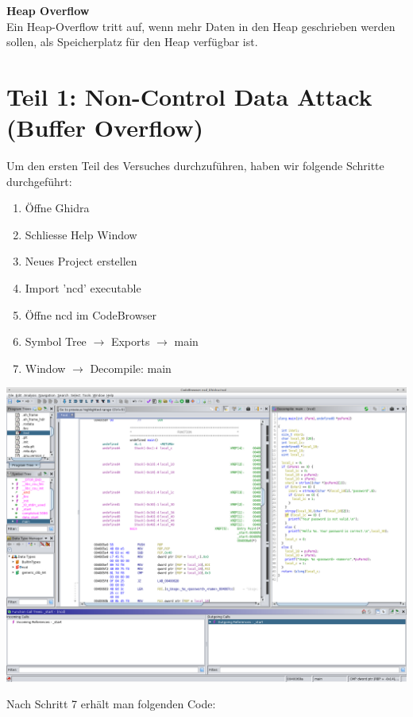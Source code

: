 \documentclass[12pt,a4paper]{article}
\begin{document}
\textbf{Heap Overflow}\\
Ein Heap-Overflow tritt auf, wenn mehr Daten in den Heap geschrieben werden sollen, als Speicherplatz für 
den Heap verfügbar ist.
\bigskip

\section*{Teil 1: Non-Control Data Attack (Buffer Overflow)}

Um den ersten Teil des Versuches durchzuführen, haben wir folgende Schritte durchgeführt:

\begin{enumerate}
\item Öffne Ghidra
\item Schliesse Help Window
\item Neues Project erstellen
\item Import 'ncd' executable
\item Öffne ncd im CodeBrowser
\item Symbol Tree $\rightarrow$ Exports $\rightarrow$ main
\item Window $\rightarrow$ Decompile: main 
\end{enumerate}

\begin{center}
\includegraphics[scale=0.3]{ghidra.png}
\end{center}

Nach Schritt 7 erhält man folgenden Code:\\
\end{document}
